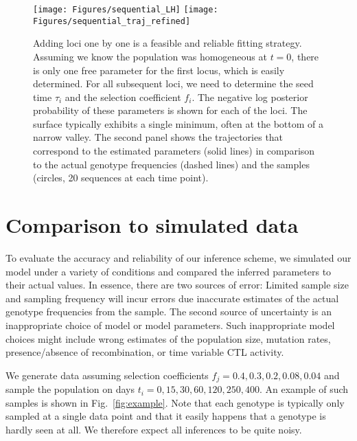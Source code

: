 \documentclass[rmp,twocolumn]{revtex4}
\newcommand{\FIG}[1]{Fig.~\ref{fig:#1}}
\newcommand{\fcoeff}{f}
\begin{document}
\begin{figure}[htp]
\begin{center}
  \texttt{[image: Figures/sequential\_LH]}
  \texttt{[image: Figures/sequential\_traj\_refined]}
  \caption[labelInTOC]{Adding loci one by one is a feasible and reliable
  fitting strategy. Assuming we know the population was homogeneous at $t=0$,
  there is only one free parameter for the first locus, which is easily
  determined.  For all subsequent loci, we need to determine the seed time
  $\tau_i$ and the selection coefficient $\fcoeff_i$. The negative log posterior
  probability of these parameters is shown for each of the loci. The surface
  typically exhibits a single minimum, often at the bottom of a narrow valley. 
  The second panel shows the trajectories that correspond to the estimated
  parameters (solid lines) in comparison to the actual genotype frequencies
  (dashed lines) and the samples (circles, 20 sequences at each time point). }
  \label{fig:sequential_fitting}
\end{center}
\end{figure}

\section*{Comparison to simulated data}
To evaluate the accuracy and reliability of our inference scheme, we simulated
our model under a variety of conditions and compared the inferred parameters to
their actual values. In essence, there are two sources of error:
Limited sample size and sampling frequency will incur errors due
inaccurate estimates of the actual genotype frequencies from the
sample. The second source of uncertainty is an inappropriate choice
of model or model parameters. Such inappropriate model choices might include
wrong estimates of the population size, mutation rates, presence/absence
of recombination, or time variable CTL activity.

We generate data assuming selection coefficients $f_j = 0.4, 0.3, 0.2, 0.08,
0.04$ and sample the population on days $t_i=0, 15,30,60,120,250,400$. An
example of such samples is shown in \FIG{example}. Note that each genotype
is typically only sampled at a single data point and that it easily happens that
a genotype is hardly seen at all. We therefore expect all inferences to be quite
noisy.
\end{document}
